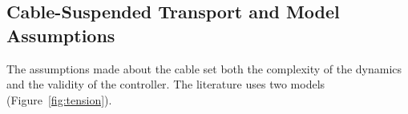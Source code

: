 
\subsection{Cable-Suspended Transport and Model Assumptions}
\label{sec:lit_models}

The assumptions made about the cable set both the complexity of the dynamics and the validity of
the controller. The literature uses two models (Figure~\ref{fig:tension}).

